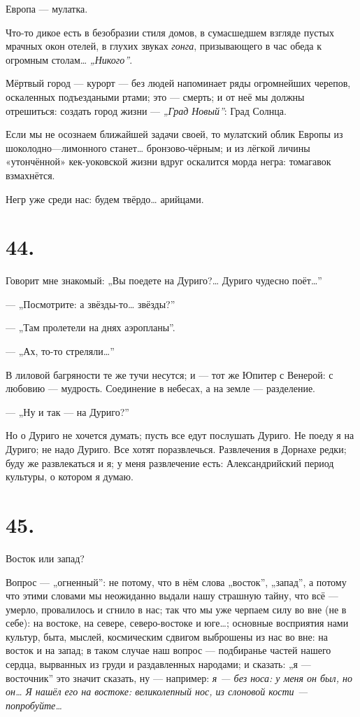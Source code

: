 \documentclass[12pt,a4paper,oneside]{book}
\begin{document}
Европа — мулатка.

Что-то дикое есть в безобразии стиля домов, в сумасшедшем взгляде пустых мрачных окон отелей, в глухих звуках \emph{гонга}, призывающего в час обеда к огромным столам… \emph{„Никого”}.

Мёртвый город — курорт — без людей напоминает ряды огромнейших черепов, оскаленных подъездаными ртами; это — смерть; и от неё мы должны отрешиться: создать город жизни — \emph{„Град Новый”}: Град Солнца.

Если мы не осознаем ближайшей задачи своей, то мулатский облик Европы из шоколодно—лимонного станет… бронзово-чёрным; и из лёгкой личины «утончённой» кек-уоковской жизни вдруг оскалится морда негра: томагавок взмахнётся.

Негр уже среди нас: будем твёрдо… арийцами.

\section*{44.}

Говорит мне знакомый: „Вы поедете на Дуриго?… Дуриго чудесно поёт…”

— „Посмотрите: а звёзды-то… звёзды?”

— „Там пролетели на днях аэропланы”.

— „Ах, то-то стреляли…”

В лиловой багряности те же тучи несутся; и — тот же Юпитер с Венерой: с любовию — мудрость. Соединение в небесах, а на земле — разделение.

— „Ну и так — на Дуриго?”

Но о Дуриго не хочется думать; пусть все едут послушать Дуриго. Не поеду я на Дуриго; не надо Дуриго. Все хотят поразвлечься. Развлечения в Дорнахе редки; буду же развлекаться и я; у меня развлечение есть: Александрийский период культуры, о котором я думаю.

\section*{45.}

Восток или запад?

Вопрос — „огненный”: не потому, что в нём слова „восток”, „запад”, а потому что этими словами мы неожиданно выдали нашу страшную тайну, что всё — умерло, провалилось и сгнило в нас; так что мы уже черпаем силу во вне (не в себе): на востоке, на севере, северо-востоке и юге…; основные восприятия нами культур, быта, мыслей, космическим сдвигом выброшены из нас во вне: на восток и на запад; в таком случае наш вопрос — подбиранье частей нашего сердца, вырванных из груди и раздавленных народами; и сказать: „я — восточник” это значит сказать, ну — например: \emph{я — без носа: у меня он был, но он… Я нашёл его на востоке: великолепный нос, из слоновой кости — попробуйте…}
\end{document}
